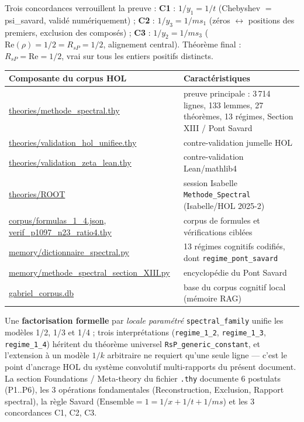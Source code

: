 \documentclass[11pt,a4paper]{article}
\begin{document}
Trois concordances verrouillent la preuve : \textbf{C1} : $1/y_1 = 1/t$
(Chebyshev $=$ psi\_savard, validé numériquement) ; \textbf{C2} :
$1/y_3 = 1/ms_1$ (zéros $\leftrightarrow$ positions des premiers, exclusion des
composés) ; \textbf{C3} : $1/y_2 = 1/ms_3$ ($\mathrm{Re}(\rho) = 1/2 = R_{sP} = 1/2$,
alignement central). Théorème final : $R_{sP} = \mathrm{Re} = 1/2$, vrai sur tous
les entiers positifs distincts.

\begin{center}\small
\begin{tabular}{@{}p{} p{}@{}}
\toprule
\rowcolor{spectralgris}
Composante du corpus HOL & Caractéristiques \\
\midrule
\url{theories/methode_spectral.thy} & preuve principale : 3\,714 lignes, 133 lemmes, 27 théorèmes, 13 régimes, Section XIII / Pont Savard \\
\url{theories/validation_hol_unifiee.thy} & contre-validation jumelle HOL \\
\url{theories/validation_zeta_lean.thy} & contre-validation Lean/mathlib4 \\
\url{theories/ROOT} & session Isabelle \texttt{Methode\_Spectral} (Isabelle/HOL 2025-2) \\
\url{corpus/formulas_1_4.json}, \url{verif_p1097_n23_ratio4.thy} & corpus de formules et vérifications ciblées \\
\url{memory/dictionnaire_spectral.py} & 13 régimes cognitifs codifiés, dont \texttt{regime\_pont\_savard} \\
\url{memory/methode_spectral_section_XIII.py} & encyclopédie du Pont Savard \\
\url{gabriel_corpus.db} & base du corpus cognitif local (mémoire RAG) \\
\bottomrule
\end{tabular}
\end{center}

Une \textbf{factorisation formelle} par \emph{locale paramétré}
\texttt{spectral\_family} unifie les modèles 1/2, 1/3 et 1/4 ; trois
interprétations (\texttt{regime\_1\_2}, \texttt{regime\_1\_3},
\texttt{regime\_1\_4}) héritent du théorème universel
\texttt{RsP\_generic\_constant}, et l'extension à un modèle $1/k$ arbitraire ne
requiert qu'une seule ligne --- c'est le point d'ancrage HOL du système
convolutif multi-rapports du présent document. La section \og Foundations /
Meta-theory \fg{} du fichier \texttt{.thy} documente 6 postulats (P1..P6), les
3 opérations fondamentales (Reconstruction, Exclusion, Rapport spectral), la
règle Savard ($\text{Ensemble} = 1 = 1/x + 1/t + 1/ms$) et les 3 concordances
C1, C2, C3.
\end{document}
